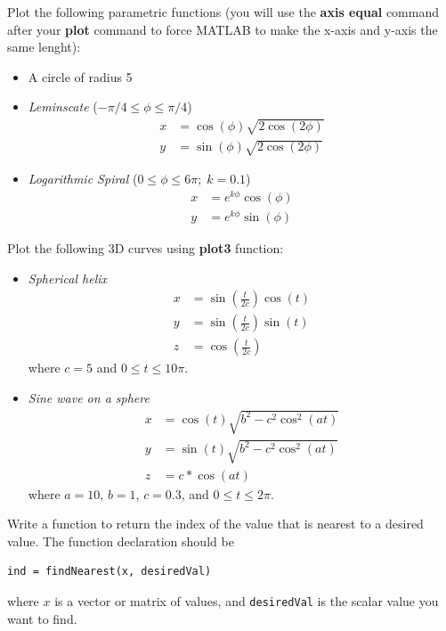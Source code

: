 \documentclass[12pt]{TDTP}
\begin{document}
\Exo
Plot the following parametric functions (you will use the \textbf{axis equal }command after your \textbf{plot} command to force MATLAB to make the x-axis and y-axis the same lenght):
\begin{itemize}
\item A circle of radius 5
\item \textit{Leminscate} ($-\pi/4 \leq \phi \leq \pi/4$)
\begin{align*}
x &= \cos(\phi) \sqrt{2\cos(2\phi)} \\
y &= \sin(\phi) \sqrt{2\cos(2\phi)}
\end{align*}

\item \textit{Logarithmic Spiral} ($0 \leq \phi \leq 6\pi; \; k=0.1$)
\begin{align*}
x &= e^{k\phi}\cos(\phi) \\
y &= e^{k\phi}\sin(\phi) 
\end{align*}

\end{itemize}
\Exo
Plot the following 3D curves using \textbf{plot3} function:
\begin{itemize}
\item \textit{Spherical helix}
\begin{align*}
x &= \sin(\frac{t}{2c}) \cos(t) \\
y &= \sin(\frac{t}{2c}) \sin(t) \\
z &= \cos(\frac{t}{2c})
\end{align*}
where $c=5$ and $0\leq t \leq 10\pi$.

\item \textit{Sine wave on a sphere}
\begin{align*}
x &= \cos(t) \sqrt{b^2 -c^2 \cos^2(at)} \\
y &= \sin(t) \sqrt{b^2 -c^2 \cos^2(at)} \\
z &= c*\cos(at)
\end{align*}
where $a=10$, $b=1$, $c=0.3$, and $0 \leq t \leq 2\pi$.
\end{itemize}

\Exo
Write a function to return the index of the value that is nearest to a desired value.
The function declaration should be
\begin{verbatim}
ind = findNearest(x, desiredVal)
\end{verbatim}
where $x$ is a vector or matrix of values, and \texttt{desiredVal} is the scalar value you want to find.
\end{document}
